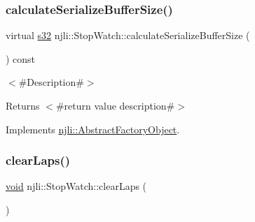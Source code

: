\mbox{\label{classnjli_1_1_stop_watch_a72e1052a6525fe6d6887bd985b1ef8d3}} 
\subsubsection{\texorpdfstring{calculate\+Serialize\+Buffer\+Size()}{calculateSerializeBufferSize()}}
{\footnotesize\ttfamily virtual \mbox{\hyperlink{_util_8h_aa62c75d314a0d1f37f79c4b73b2292e2}{s32}} njli\+::\+Stop\+Watch\+::calculate\+Serialize\+Buffer\+Size (\begin{DoxyParamCaption}{ }\end{DoxyParamCaption}) const\hspace{0.3cm}{\ttfamily [virtual]}}

$<$\#\+Description\#$>$

\begin{DoxyReturn}{Returns}
$<$\#return value description\#$>$ 
\end{DoxyReturn}


Implements \mbox{\hyperlink{classnjli_1_1_abstract_factory_object_a4763d05bc9dc37c559111f8bb30e1dd8}{njli\+::\+Abstract\+Factory\+Object}}.

\mbox{\label{classnjli_1_1_stop_watch_a190d183506dce6ce0497fd339e1891a8}} 
\subsubsection{\texorpdfstring{clear\+Laps()}{clearLaps()}}
{\footnotesize\ttfamily \mbox{\hyperlink{_thread_8h_af1e856da2e658414cb2456cb6f7ebc66}{void}} njli\+::\+Stop\+Watch\+::clear\+Laps (\begin{DoxyParamCaption}{ }\end{DoxyParamCaption})}

\mbox{\label{classnjli_1_1_stop_watch_a89592642454c69b7de06a272f56a8dd3}} 
